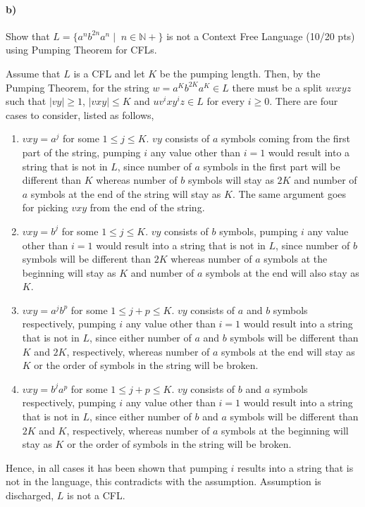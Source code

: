 \documentclass[a4paper,12pt]{article}
\begin{document}
\newpage

\paragraph{b)} Show that $L=\{a^n b^{2n} a^n \mid \; n \in \mathbb{N+} \}$ is not a Context Free Language \hfill \small{(10/20 pts)} \\
using Pumping Theorem for CFLs. \\

\begin{tcolorbox}
Assume that $L$ is a CFL and let $K$ be the pumping length. Then, by the Pumping Theorem, for the string $w = a^Kb^{2K}a^K \in L$ there must be a split $uvxyz$ such that $|vy| \geq 1$, $|vxy| \leq K$ and $uv^ixy^iz \in L$ for every $i \geq 0$. There are four cases to consider, listed as follows,
\begin{enumerate}
	\item $vxy = a^j$ for some $1 \leq j \leq K$. $vy$ consists of $a$ symbols coming from the first part of the string, pumping $i$ any value other than $i = 1$ would result into a string that is not in $L$, since number of $a$ symbols in the first part will be different than $K$ whereas number of $b$ symbols will stay as $2K$ and number of $a$ symbols at the end of the string will stay as $K$. The same argument goes for picking $vxy$ from the end of the string.
	\item $vxy = b^j$ for some $1 \leq j \leq K$. $vy$ consists of $b$ symbols, pumping $i$ any value other than $i = 1$ would result into a string that is not in $L$, since number of $b$ symbols will be different than $2K$ whereas number of $a$ symbols at the beginning will stay as $K$ and number of $a$ symbols at the end will also stay as $K$.
	\item $vxy = a^jb^p$ for some $1 \leq j + p \leq K$. $vy$ consists of $a$ and $b$ symbols respectively, pumping $i$ any value other than $i = 1$ would result into a string that is not in $L$, since either number of $a$ and $b$ symbols will be different than $K$ and $2K$,  respectively, whereas number of $a$ symbols at the end will stay as $K$ or the order of symbols in the string will be broken.
	\item $vxy = b^ja^p$ for some $1 \leq j + p \leq K$. $vy$ consists of $b$ and $a$ symbols respectively, pumping $i$ any value other than $i = 1$ would result into a string that is not in $L$, since either number of $b$ and $a$ symbols will be different than $2K$ and $K$,  respectively, whereas number of $a$ symbols at the beginning will stay as $K$ or the order of symbols in the string will be broken.
\end{enumerate}
Hence, in all cases it has been shown that pumping $i$ results into a string that is not in the language, this contradicts with the assumption. Assumption is discharged, $L$ is not a CFL.
\end{tcolorbox}
\end{document}
